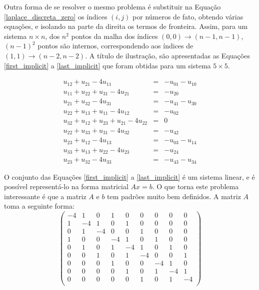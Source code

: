 \documentclass[journal]{IEEEtran}
\begin{document}
Outra forma de se resolver o mesmo problema é substituir na Equação \ref{laplace_discreta_zero} os índices $(i,j)$ por números de fato, obtendo várias equações, e isolando na parte da direita os termos de fronteira. Assim, para um sistema $n\times n$, dos $n^2$ pontos da malha dos índices $(0,0)\rightarrow (n-1,n-1)$, $(n-1)^2$ pontos são internos, correspondendo aos índices de $(1,1)\rightarrow (n-2,n-2)$. A título de ilustração, são apresentadas as Equações \ref{first_implicit} a \ref{last_implicit} que foram obtidas para um sistema $5\times 5$.

\begin{eqnarray}
u_{12}+u_{21} -4u_{11}& = & -u_{01}-u_{10} \label{first_implicit} \\
u_{11}+u_{22}+u_{31}-4u_{21}& =& -u_{20} \\
u_{21}+u_{32}-4u_{31}&=&-u_{41}-u_{30} \\
u_{22}+u_{13}+u_{11}-4u_{12}&=&-u_{02} \\
u_{32}+u_{12}+u_{23}+u_{21}-4u_{22}&=&0 \\
u_{22}+u_{33}+u_{31}-4u_{32}&=&-u_{42} \\
u_{23}+u_{12}-4u_{13}&=&-u_{03}-u_{14} \\
u_{33}+u_{13}+u_{22}-4u_{23}&=&-u_{24} \\
u_{23}+u_{32}-4u_{33}&=&-u_{43}-u_{34} \label{last_implicit}
\end{eqnarray}

O conjunto das Equações \ref{first_implicit} a \ref{last_implicit} é um sistema linear, e é possível representá-lo na forma matricial $Ax = b$. O que torna este problema interessante é que a matriz $A$ e $b$ tem padrões muito bem definidos. A matriz $A$ toma a seguinte forma:
\[ \left( \begin{array}{ccccccccc}
-4 & 1 & 0 & 1 & 0 & 0 & 0 & 0 & 0 \\ %
1 & -4 & 1 & 0 & 1 & 0 & 0 & 0 & 0 \\ %
0 & 1 & -4 & 0 & 0 & 1 & 0 & 0 & 0 \\ %
1 & 0 & 0 & -4 & 1 & 0 & 1 & 0 & 0 \\ %
0 & 1 & 0 & 1 & -4 & 1 & 0 & 1 & 0 \\ %
0 & 0 & 1 & 0 & 1 & -4 & 0 & 0 & 1 \\ %
0 & 0 & 0 & 1 & 0 & 0 & -4 & 1 & 0 \\ %
0 & 0 & 0 & 0 & 1 & 0 & 1 & -4 & 1 \\ %
0 & 0 & 0 & 0 & 0 & 1 & 0 & 1 & -4 \\ %
\end{array} \right)\]
\end{document}
